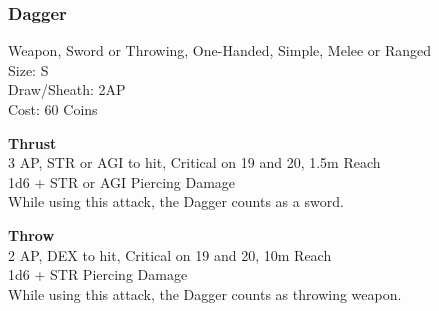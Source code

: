 \subsubsection{Dagger}\label{weapon:dagger}
Weapon, Sword or Throwing, One-Handed, Simple, Melee or Ranged\\
Size: S\\
Draw/Sheath: 2AP\\
Cost: 60 Coins

\textbf{Thrust} \\
3 AP, STR or AGI to hit, Critical on 19 and 20, 1.5m Reach\\
1d6 + \texttimes STR or AGI Piercing Damage\\
While using this attack, the Dagger counts as a sword.

\textbf{Throw} \\
2 AP, DEX to hit, Critical on 19 and 20, 10m Reach\\
1d6 + \texttimes STR Piercing Damage\\
While using this attack, the Dagger counts as throwing weapon.

